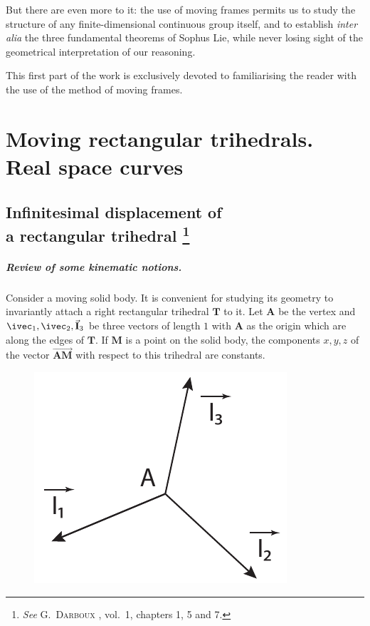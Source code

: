 But there are even more to it: the use of moving frames permits us to study the structure of any finite-dimensional continuous group itself, and to establish \emph{inter alia} the three fundamental theorems of Sophus Lie, while never losing sight of the geometrical interpretation of our reasoning.

This first part of the work is exclusively devoted to familiarising the reader with the use of the method of moving frames. 



\chapter{Moving rectangular trihedrals. Real space curves}
\label{cha:1}


\section[{Infinitesimal displacement of a rectangular trihedral}]{Infinitesimal displacement of\\a rectangular trihedral \footnote{\emph{See} \textsc{G.~Darboux} \cite{1}, vol.\ 1, chapters 1, 5 and 7.}}
\label{sec:1.1}

\paragraph{Review of some kinematic notions.}
\label{sec:2}
Consider a moving solid body. It is convenient for studying its geometry to invariantly attach a right rectangular trihedral $\mathbf{T}$ to it. Let $\mathbf{A}$ be the vertex and $\ivec_{1}, \ivec_{2}, \vec{ \mathbf{I}}_{3}$ be three vectors of length $1$ with $\mathbf{A}$ as the origin which are along the edges of $\mathbf{T}$. If $\mathbf{M}$ is a point on the solid body, the components $x, y, z$ of the vector $\overrightarrow{\mathbf{AM}}$ with respect to this trihedral are constants.

\begin{figure}[h]
  \caption{}
  \centering
\includegraphics{cartangrp-f1}  
\end{figure}

